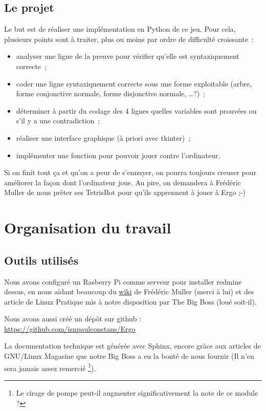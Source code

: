 \documentclass[12pt, algo]{cours}
\begin{document}
\subsection{Le projet}

Le but est de réaliser une implémentation en Python de ce jeu. Pour cela, plusieurs points sont à traiter, plus ou moins par ordre de difficulté croissante~:
\nopagebreak
\begin{itemize}
\item analyser une ligne de la preuve pour vérifier qu'elle est syntaxiquement correcte~;
\item coder une ligne syntaxiquement correcte sous une forme exploitable (arbre, forme conjonctive normale, forme disjonctive normale, \dots ?)~;
\item déterminer à partir du codage des 4 lignes quelles variables sont prouvées ou s'il y a une contradiction~;
\item réaliser une interface graphique (à priori avec tkinter)~;
\item implémenter une fonction pour pouvoir jouer contre l'ordinateur.
\end{itemize}

Si on finit tout ça et qu'on a peur de s'ennuyer, on pourra toujours creuser pour améliorer la façon dont l'ordinateur joue. Au pire, on demandera à Frédéric Muller de nous prêter ses TetrisBot pour qu'ils apprennent à jouer à Ergo ;-)


\section{Organisation du travail}

\subsection{Outils utilisés}

Nous avons configuré un Rasberry Pi comme serveur pour installer redmine dessus, en nous aidant beaucoup du \href{http://juramaths.fr/redmine/projects/serveur-web-sur-un-raspberry-pi/wiki}{wiki} de Frédéric Muller (merci à lui) et des article de Linux Pratique mis à notre disposition par The Big Boss (loué soit-il).

Nous avons aussi créé un dépôt sur github : \url{https://github.com/isnpaulconstans/Ergo}

La documentation technique est générée avec Sphinx, encore grâce aux articles de GNU/Linux Magasine que notre Big Boss a eu la bonté de nous fournir (Il n'en sera jamais assez remercié \footnote{Le cirage de pompe peut-il augmenter significativement la note de ce module ?}).
\end{document}
